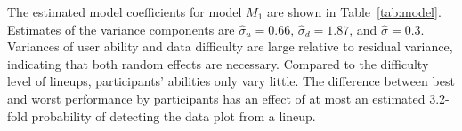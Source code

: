 \documentclass{article}\usepackage[]{graphicx}\usepackage[]{color}
\begin{document}
\begin{appendix}
The estimated model coefficients for model $M_1$ are shown in Table~\ref{tab:model}. 
Estimates of the variance components are $\widehat{\sigma}_u = 0.66$, $\widehat{\sigma}_d=1.87$, and $\widehat{\sigma} = 0.3$. Variances of user ability and data difficulty are large relative to residual variance, indicating that both random effects are necessary.
%
Compared to the difficulty level of lineups, participants' abilities only vary little. The difference between best and worst performance by participants has an effect of at most an estimated 
3.2-fold probability of detecting the data plot from a lineup. 

% 
% 
% 

\end{appendix}
\end{document}
